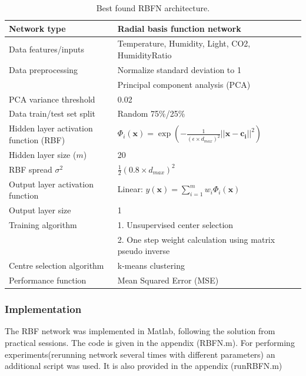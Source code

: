 \documentclass[a4paper, 11pt]{article}
\begin{document}
\begin{table}[h!]
\centering
\begin{tabular}{|l l|} 
 \hline
 Network type & Radial basis function network  \\ 
 \hline
 Data features/inputs & Temperature, Humidity, Light, CO2, HumidityRatio\\
 Data preprocessing & Normalize standard deviation to 1 \\
 & Principal component analysis (PCA) \\
 PCA variance threshold & 0.02 \\ 
 Data train/test set split & Random 75\%/25\% \\
 \hline
 Hidden layer activation function (RBF) & $
\Phi_i(\boldsymbol{x}) = \exp\left(-\frac{1}{(\epsilon \times d_{max})^2} \lvert\lvert \boldsymbol{x} -  \boldsymbol{c_i} \rvert\rvert ^2\right)  
$  \\
 Hidden layer size ($m$) & 20  \\
 RBF spread $\sigma^2$ & $\frac{1}{2}(0.8 \times d_{max})^2$   \\
 \hline
 Output layer activation function & Linear: $y(\boldsymbol{x}) = \displaystyle\sum_{i=1}^{m} w_i \Phi_i(\boldsymbol{x})$ \\
 Output layer size & 1 \\
 \hline
 Training algorithm & 1. Unsupervised center selection \\ 
 & 2. One step weight calculation using matrix pseudo inverse  \\
 Centre selection algorithm & k-means clustering \\
 Performance function & Mean Squared Error (MSE)  \\ [1ex] 
 \hline
\end{tabular}
\caption{Best found RBFN architecture.}
\label{table:architecture}
\end{table}

\subsubsection{Implementation}
The RBF network was implemented in Matlab, following the solution from practical sessions. The code is given in the appendix (RBFN.m). For performing experiments(rerunning network several times with different parameters) an additional script was used. It is also provided in the appendix (runRBFN.m)
\end{document}
